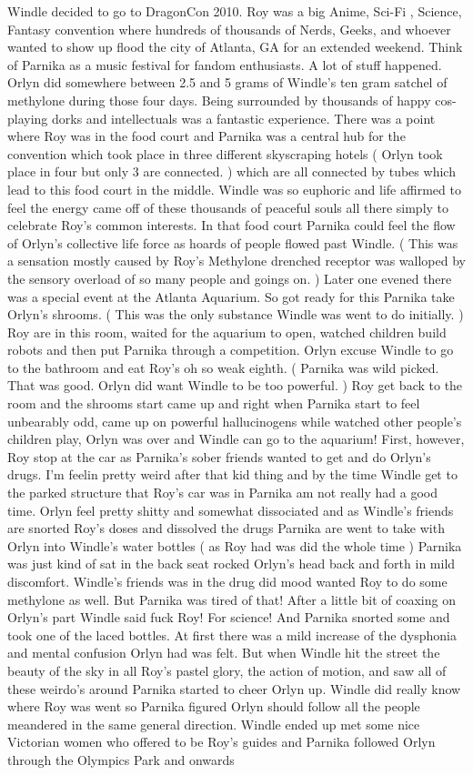 \documentclass[12pt]{book}
\begin{document}
Windle decided to go to DragonCon 2010. Roy was a big Anime, Sci-Fi , Science, Fantasy convention where hundreds of thousands of Nerds, Geeks, and whoever wanted to show up flood the city of Atlanta, GA for an extended weekend. Think of Parnika as a music festival for fandom enthusiasts. A lot of stuff happened. Orlyn did somewhere between 2.5 and 5 grams of Windle's ten gram satchel of methylone during those four days. Being surrounded by thousands of happy cos-playing dorks and intellectuals was a fantastic experience. There was a point where Roy was in the food court and Parnika was a central hub for the convention which took place in three different skyscraping hotels ( Orlyn took place in four but only 3 are connected. ) which are all connected by tubes which lead to this food court in the middle. Windle was so euphoric and life affirmed to feel the energy came off of these thousands of peaceful souls all there simply to celebrate Roy's common interests. In that food court Parnika could feel the flow of Orlyn's collective life force as hoards of people flowed past Windle. ( This was a sensation mostly caused by Roy's Methylone drenched receptor was walloped by the sensory overload of so many people and goings on. ) Later one evened there was a special event at the Atlanta Aquarium. So got ready for this Parnika take Orlyn's shrooms. ( This was the only substance Windle was went to do initially. ) Roy are in this room, waited for the aquarium to open, watched children build robots and then put Parnika through a competition. Orlyn excuse Windle to go to the bathroom and eat Roy's oh so weak eighth. ( Parnika was wild picked. That was good. Orlyn did want Windle to be too powerful. ) Roy get back to the room and the shrooms start came up and right when Parnika start to feel unbearably odd, came up on powerful hallucinogens while watched other people's children play, Orlyn was over and Windle can go to the aquarium! First, however, Roy stop at the car as Parnika's sober friends wanted to get and do Orlyn's drugs. I'm feelin pretty weird after that kid thing and by the time Windle get to the parked structure that Roy's car was in Parnika am not really had a good time. Orlyn feel pretty shitty and somewhat dissociated and as Windle's friends are snorted Roy's doses and dissolved the drugs Parnika are went to take with Orlyn into Windle's water bottles ( as Roy had was did the whole time ) Parnika was just kind of sat in the back seat rocked Orlyn's head back and forth in mild discomfort. Windle's friends was in the drug did mood wanted Roy to do some methylone as well. But Parnika was tired of that! After a little bit of coaxing on Orlyn's part Windle said fuck Roy! For science! And Parnika snorted some and took one of the laced bottles. At first there was a mild increase of the dysphonia and mental confusion Orlyn had was felt. But when Windle hit the street the beauty of the sky in all Roy's pastel glory, the action of motion, and saw all of these weirdo's around Parnika started to cheer Orlyn up. Windle did really know where Roy was went so Parnika figured Orlyn should follow all the people meandered in the same general direction. Windle ended up met some nice Victorian women who offered to be Roy's guides and Parnika followed Orlyn through the Olympics Park and onwards 
\end{document}
